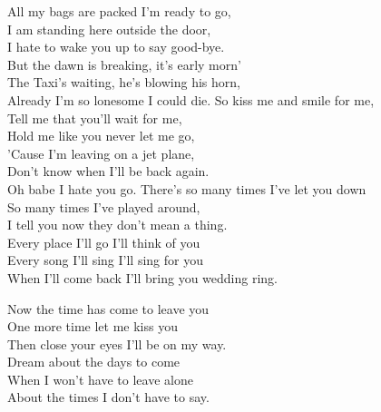 \ve
All my bags are packed I'm ready to go,\\
I am standing here outside the door,\\
I hate to wake you up to say good-bye. \\
But the dawn is breaking, it's early morn'\\
The Taxi's waiting, he's blowing his horn,\\
Already I'm so lonesome I could die. 
\cho
So kiss me and smile for me,\\
Tell me that you'll wait for me,\\
Hold me like you never let me go, \\
'Cause I'm leaving on a jet plane,\\
Don't know when I'll be back again. \\
Oh babe I hate you go. 
\ve
There's so many times I've let you down\\
So many times I've played around,\\
I tell you now they don't mean a thing.\\
Every place I'll go I'll think of you\\
Every song I'll sing I'll sing for you\\
When I'll come back I'll bring you wedding ring.

\ve
Now the time has come to leave you\\
One more time let me kiss you\\
Then close your eyes I'll be on my way.\\
Dream about the days to come\\
When I won't have to leave alone\\
About the times I don't have to say.

\esong
